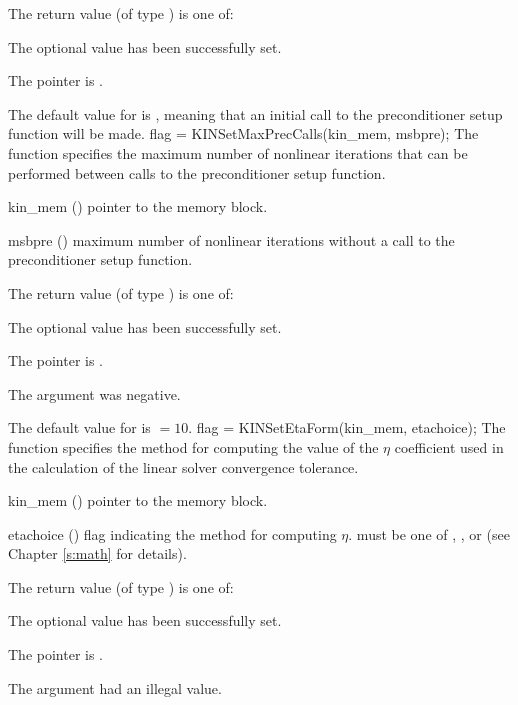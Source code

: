 {
  The return value  (of type ) is one of:
  \begin{args}
  \item[\Id{KIN\_SUCCESS}] 
    The optional value has been successfully set.
  \item[\Id{KIN\_MEM\_NULL}]
    The  pointer is .
  \end{args}
}
{
  The default value for  is , meaning that an initial call
  to the preconditioner setup function will be made.
}
{
flag = KINSetMaxPrecCalls(kin\_mem, msbpre);
}
{
  The function  specifies the maximum number of 
  nonlinear iterations that can be performed between calls to the 
  preconditioner setup function.
}
{
  \begin{args}
  \item[kin\_mem] ()
    pointer to the {\kinsol} memory block.
  \item[msbpre] ()
    maximum number of nonlinear iterations without a call
    to the preconditioner setup function.
  \end{args}
}
{
  The return value  (of type ) is one of:
  \begin{args}
  \item[\Id{KIN\_SUCCESS}] 
    The optional value has been successfully set.
  \item[\Id{KIN\_MEM\_NULL}]
    The  pointer is .
  \item[\Id{KIN\_ILL\_INPUT}]
    The argument  was negative.
  \end{args}
}
{
  The default value for  is  $=10$.
}
{
flag = KINSetEtaForm(kin\_mem, etachoice);
}
{
  The function  specifies the method for computing
  the value of the $\eta$ coefficient used in the calculation of the
  linear solver convergence tolerance.
}
{
  \begin{args}[etachoice]
  \item[kin\_mem] ()
    pointer to the {\kinsol} memory block.
  \item[etachoice] ()
    flag indicating the method for computing $\eta$.  must be one
    of , , or 
    (see Chapter \ref{s:math} for details).
  \end{args}
}
{
  The return value  (of type ) is one of:
  \begin{args}
  \item[\Id{KIN\_SUCCESS}] 
    The optional value has been successfully set.
  \item[\Id{KIN\_MEM\_NULL}]
    The  pointer is .
  \item[\Id{KIN\_ILL\_INPUT}]
    The argument  had an illegal value.
  \end{args}
}
